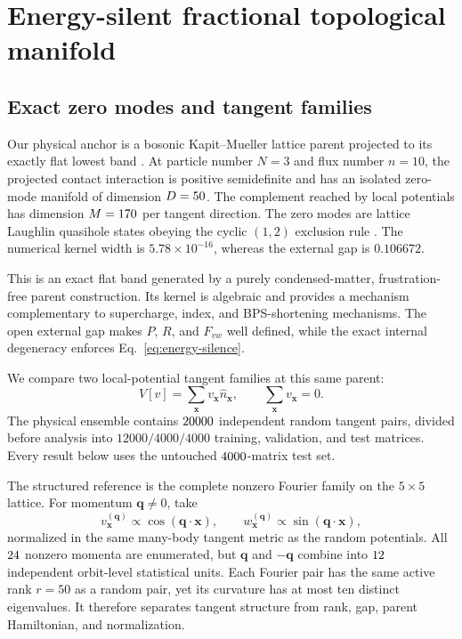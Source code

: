 \section{Energy-silent fractional topological manifold}
\label{sec:physical}

\subsection{Exact zero modes and tangent families}

Our physical anchor is a bosonic Kapit--Mueller lattice parent projected to its
exactly flat lowest band \cite{kapitmueller2010}.
At particle number \(N=3\) and flux number \(n=10\), the projected contact
interaction is positive semidefinite and has an isolated zero-mode manifold
of dimension \(D=50\).
The complement reached by local potentials has dimension
\(M=170\) per tangent direction.
The zero modes are lattice Laughlin quasihole states obeying the cyclic
\((1,2)\) exclusion rule \cite{laughlin1983,bernevighaldane2008,chenseidel2015}.
The numerical kernel width is \(5.78\times10^{-16}\), whereas the external
gap is \(0.106672\).

This is an exact flat band generated by a purely condensed-matter,
frustration-free parent construction.  Its kernel is algebraic and provides a
mechanism complementary to supercharge, index, and BPS-shortening mechanisms.
The open external gap makes \(P\), \(R\), and \(F_{vw}\) well defined, while
the exact internal degeneracy enforces Eq.~\eqref{eq:energy-silence}.

We compare two local-potential tangent families at this same parent:
\begin{equation}
 V[v]=\sum_{\bm x}v_{\bm x}\hat n_{\bm x},\qquad
 \sum_{\bm x}v_{\bm x}=0.
 \label{eq:local-potentials}
\end{equation}
The physical ensemble contains \(20000\) independent random
tangent pairs, divided before analysis into
\(12000/4000/4000\) training, validation, and test matrices.
Every result below uses the untouched \(4000\)-matrix test
set.

The structured reference is the complete nonzero Fourier family on the
\(5\times5\) lattice.
For momentum \(\bm q\neq0\), take
\begin{equation}
 v_{\bm x}^{(\bm q)}\propto\cos(\bm q\cdot\bm x),\qquad
 w_{\bm x}^{(\bm q)}\propto\sin(\bm q\cdot\bm x),
 \label{eq:fourier-control}
\end{equation}
normalized in the same many-body tangent metric as the random potentials.
All \(24\) nonzero momenta are enumerated, but
\(\bm q\) and \(-\bm q\) combine into \(12\) independent
orbit-level statistical units.
Each Fourier pair has the same active rank \(r=50\) as a random pair, yet its
curvature has at most ten distinct eigenvalues.
It therefore separates tangent structure from rank, gap, parent Hamiltonian,
and normalization.

